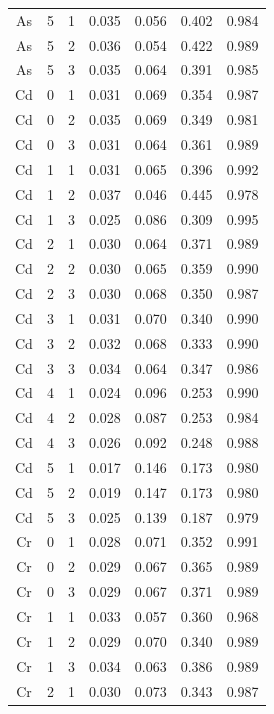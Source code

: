 \documentclass[ms, hidelinks]{uncgdissertationexp}
\theoremstyle{plain}
\theoremstyle{definition}
\theoremstyle{remark}
\begin{document}
\begin{longtable}{ccccccc}
As & 5 & 1 & 0.035 & 0.056 & 0.402 & 0.984\\
\rowcolor{gray!6}  As & 5 & 2 & 0.036 & 0.054 & 0.422 & 0.989\\
As & 5 & 3 & 0.035 & 0.064 & 0.391 & 0.985\\
\rowcolor{gray!6}  Cd & 0 & 1 & 0.031 & 0.069 & 0.354 & 0.987\\
Cd & 0 & 2 & 0.035 & 0.069 & 0.349 & 0.981\\
\rowcolor{gray!6}  Cd & 0 & 3 & 0.031 & 0.064 & 0.361 & 0.989\\
Cd & 1 & 1 & 0.031 & 0.065 & 0.396 & 0.992\\
\rowcolor{gray!6}  Cd & 1 & 2 & 0.037 & 0.046 & 0.445 & 0.978\\
Cd & 1 & 3 & 0.025 & 0.086 & 0.309 & 0.995\\
\rowcolor{gray!6}  Cd & 2 & 1 & 0.030 & 0.064 & 0.371 & 0.989\\
Cd & 2 & 2 & 0.030 & 0.065 & 0.359 & 0.990\\
\rowcolor{gray!6}  Cd & 2 & 3 & 0.030 & 0.068 & 0.350 & 0.987\\
Cd & 3 & 1 & 0.031 & 0.070 & 0.340 & 0.990\\
\rowcolor{gray!6}  Cd & 3 & 2 & 0.032 & 0.068 & 0.333 & 0.990\\
Cd & 3 & 3 & 0.034 & 0.064 & 0.347 & 0.986\\
\rowcolor{gray!6}  Cd & 4 & 1 & 0.024 & 0.096 & 0.253 & 0.990\\
Cd & 4 & 2 & 0.028 & 0.087 & 0.253 & 0.984\\
\rowcolor{gray!6}  Cd & 4 & 3 & 0.026 & 0.092 & 0.248 & 0.988\\
Cd & 5 & 1 & 0.017 & 0.146 & 0.173 & 0.980\\
\rowcolor{gray!6}  Cd & 5 & 2 & 0.019 & 0.147 & 0.173 & 0.980\\
Cd & 5 & 3 & 0.025 & 0.139 & 0.187 & 0.979\\
\rowcolor{gray!6}  Cr & 0 & 1 & 0.028 & 0.071 & 0.352 & 0.991\\
Cr & 0 & 2 & 0.029 & 0.067 & 0.365 & 0.989\\
\rowcolor{gray!6}  Cr & 0 & 3 & 0.029 & 0.067 & 0.371 & 0.989\\
Cr & 1 & 1 & 0.033 & 0.057 & 0.360 & 0.968\\
\rowcolor{gray!6}  Cr & 1 & 2 & 0.029 & 0.070 & 0.340 & 0.989\\
Cr & 1 & 3 & 0.034 & 0.063 & 0.386 & 0.989\\
\rowcolor{gray!6}  Cr & 2 & 1 & 0.030 & 0.073 & 0.343 & 0.987\\

\end{longtable}
\end{document}
